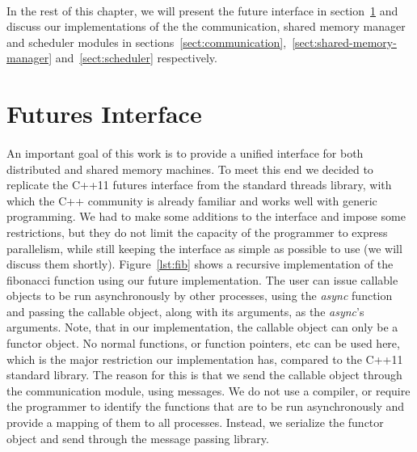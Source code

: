\paragraph{}
In the rest of this chapter, we will present the future interface in section~\ref{sect:futures-interface}
and discuss our implementations of the the communication, shared memory manager and scheduler modules in
sections~\ref{sect:communication},~\ref{sect:shared-memory-manager} and~\ref{sect:scheduler}
respectively.

\section{Futures Interface}
\label{sect:futures-interface}

\paragraph{}
An important goal of this work is to provide a unified interface for both distributed and shared memory machines.
To meet this end we decided to replicate the C++11 futures interface from the standard threads library, with which
the C++ community is already familiar and works well with generic programming.  We had to make some additions to the 
interface and impose some restrictions, but they do not limit the capacity of the programmer to express parallelism,
while still keeping the interface as simple as possible to use (we will discuss them shortly). Figure~\ref{lst:fib} 
shows a recursive implementation of the fibonacci function using our future implementation.  The user can issue 
callable objects to be run asynchronously by other processes, using the \emph{async} function and passing the 
callable object, along with its arguments, as the \emph{async}'s arguments.  Note, that in our implementation, the 
callable object can only be a functor object. No normal functions, or function pointers, etc can be used here, which
is the major restriction our implementation has, compared to the C++11 standard library.  The reason for this is that
we send the callable object through the communication module, using messages.  We do not use a compiler, or require
the programmer to identify the functions that are to be run asynchronously and provide a mapping of them to all 
processes.  Instead, we serialize the functor object and send through the message passing library.  

